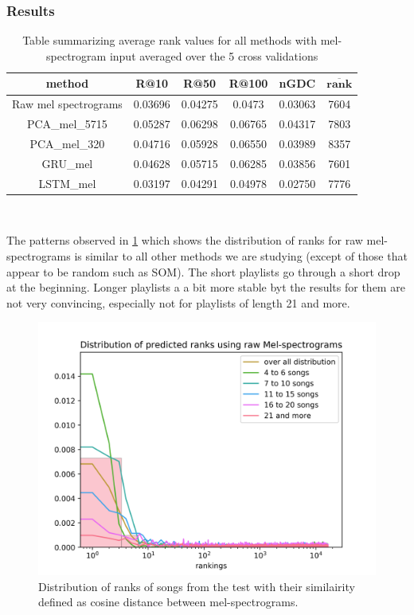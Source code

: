 \subsubsection{Results}
\begin{table}[h]
\centering
\renewcommand{\arraystretch}{1.5}
\begin{tabu} to 1\textwidth { | c || c | c | c | c | c |}
 \hline
 \textbf{method} & \textbf{R@10} & \textbf{R@50} & \textbf{R@100} & \textbf{nGDC} & $ \boldsymbol{\overline{rank}} $ \\
 \hline
 \hline
 Raw mel spectrograms & 0.03696 & 0.04275 & 0.0473 & 0.03063 & 7604 \\
 \hline
 PCA\_mel\_5715 & 0.05287 & 0.06298 & 0.06765 & 0.04317 & 7803 \\
 \hline
 PCA\_mel\_320 & 0.04716 & 0.05928 & 0.06550 & 0.03989 & 8357 \\
 \hline
 GRU\_mel  & 0.04628 & 0.05715 & 0.06285 & 0.03856 & 7601 \\
 \hline
 LSTM\_mel & 0.03197 & 0.04291 & 0.04978 & 0.02750 & 7776\\
 \hline
\end{tabu} \\
\caption{Table summarizing average rank values for all methods with mel-spectrogram input averaged over the 5 cross validations}
\label{table:mel_spec_methods}
\end{table}
The patterns observed in \ref{fig:mel_graph} which shows the distribution of ranks for raw mel-spectrograms is similar to all other methods we are studying (except of those that appear to be random such as SOM). The short playlists go through a short drop at the beginning. Longer playlists a a bit more stable byt the results for them are not very convincing, especially not for playlists of length 21 and more. 

\begin{figure}[h]
    \centering
	\includegraphics[width=120mm]{./img/mel_graph.png}
	\caption{Distribution of ranks of songs from the test with their similairity defined as cosine distance between mel-spectrograms.}
	\label{fig:mel_graph}
\end{figure}

